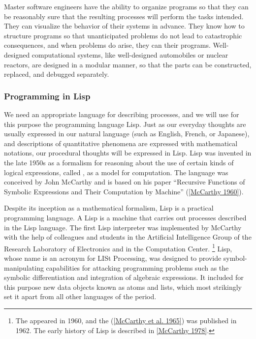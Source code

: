 Master software engineers have the ability to organize programs so that they can be reasonably sure that the resulting processes will perform the tasks intended.
They can visualize the behavior of their systems in advance.
They know how to structure programs so that unanticipated problems do not lead to catastrophic consequences, and when problems do arise, they can  their programs.
Well-designed computational systems, like well-designed automobiles or nuclear reactors, are designed in a modular manner, so that the parts can be constructed, replaced, and debugged separately.

\subsubsection*{Programming in Lisp}

We need an appropriate language for describing processes, and we will use for this purpose the programming language Lisp.
Just as our everyday thoughts are usually expressed in our natural language (such as English, French, or Japanese), and descriptions of quantitative phenomena are expressed with mathematical notations, our procedural thoughts will be expressed in Lisp.
Lisp was invented in the late 1950s as a formalism for reasoning about the use of certain kinds of logical expressions, called , as a model for computation.
The language was conceived by John McCarthy and is based on his paper “Recursive Functions of Symbolic Expressions and Their Computation by Machine” (\cref{McCarthy 1960}).

Despite its inception as a mathematical formalism, Lisp is a practical programming language.
A Lisp  is a machine that carries out processes described in the Lisp language.
The first Lisp interpreter was implemented by McCarthy with the help of colleagues and students in the Artificial Intelligence Group of the  Research Laboratory of Electronics and in the  Computation Center.%
\footnote{
	The  appeared in 1960, and the  (\cref{McCarthy et al. 1965}) was published in 1962.
	The early history of Lisp is described in \cref{McCarthy 1978}.
}
Lisp, whose name is an acronym for LISt Processing, was designed to provide symbol-manipulating capabilities for attacking programming problems such as the symbolic differentiation and integration of algebraic expressions.
It included for this purpose new data objects known as atoms and lists, which most strikingly set it apart from all other languages of the period.

